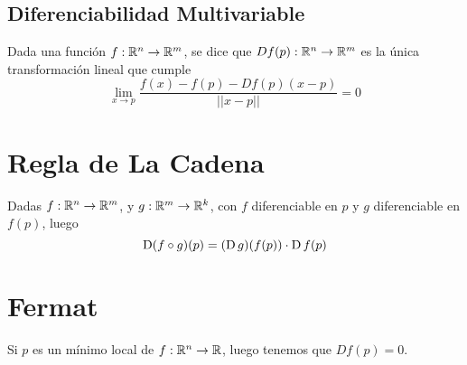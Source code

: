 \documentclass{article}
\begin{document}
    \subsection*{Diferenciabilidad Multivariable}
    \begin{defi}
        Dada una función $f : \mathbb{R}^n \to \mathbb{R}^m$, se dice que $Df(p) : \mathbb{R}^n \to \mathbb{R}^m$ es la única transformación lineal que cumple
        \[
            \lim_{x \to p} \frac{f(x) - f(p) - Df(p)(x-p)}{||x-p||} = 0
        \]
    \end{defi}
    \section*{Regla de La Cadena}
    \begin{teo}
        Dadas $f : \mathbb{R}^n \to \mathbb{R}^m$, y $g : \mathbb{R}^m \to \mathbb{R}^k$, con $f$ diferenciable en $p$ y $g$ diferenciable en $f(p)$, luego
        \[\operatorname{D} (f \circ g)(p) = (\operatorname{D} g)(f(p)) \cdot \operatorname{D} f(p)\]
    \end{teo}
    \section*{Fermat}
    \begin{teo}
        Si $p$ es un mínimo local de $f : \mathbb{R}^n \to \mathbb{R}$, luego tenemos que $Df(p) = 0$.
    \end{teo}
\end{document}
